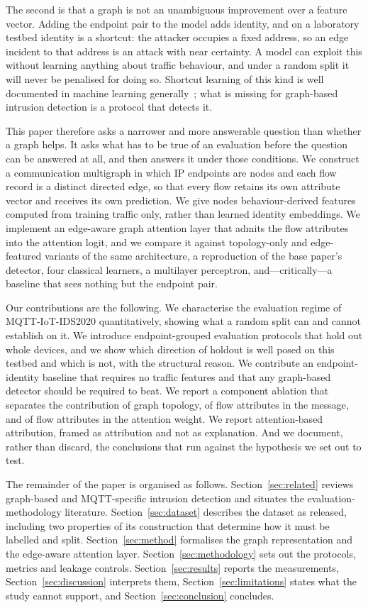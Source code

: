 The second is that a graph is not an unambiguous improvement over a feature
vector. Adding the endpoint pair to the model adds identity, and on a
laboratory testbed identity is a shortcut: the attacker occupies a fixed
address, so an edge incident to that address is an attack with near certainty.
A model can exploit this without learning anything about traffic behaviour, and
under a random split it will never be penalised for doing so. Shortcut learning
of this kind is well documented in machine learning
generally~\cite{geirhos2020shortcut}; what is missing for graph-based intrusion
detection is a protocol that detects it.

This paper therefore asks a narrower and more answerable question than whether
a graph helps. It asks what has to be true of an evaluation before the question
can be answered at all, and then answers it under those conditions. We
construct a communication multigraph in which IP endpoints are nodes and each
flow record is a distinct directed edge, so that every flow retains its own
attribute vector and receives its own prediction. We give nodes
behaviour-derived features computed from training traffic only, rather than
learned identity embeddings. We implement an edge-aware graph attention layer
that admits the flow attributes into the attention logit, and we compare it
against topology-only and edge-featured variants of the same architecture, a
reproduction of the base paper's detector, four classical learners, a
multilayer perceptron, and---critically---a baseline that sees nothing but the
endpoint pair.

Our contributions are the following. We characterise the evaluation
regime of MQTT-IoT-IDS2020 quantitatively, showing what a random split can and
cannot establish on it. We introduce endpoint-grouped evaluation protocols that
hold out whole devices, and we show which direction of holdout is well posed on
this testbed and which is not, with the structural reason. We contribute an
endpoint-identity baseline that requires no traffic features and that any
graph-based detector should be required to beat. We report a component
ablation that separates the contribution of graph topology, of flow attributes
in the message, and of flow attributes in the attention weight. We report
attention-based attribution, framed as attribution and not as explanation. And
we document, rather than discard, the conclusions that run against the
hypothesis we set out to test.

The remainder of the paper is organised as follows.
Section~\ref{sec:related} reviews graph-based and MQTT-specific intrusion
detection and situates the evaluation-methodology literature.
Section~\ref{sec:dataset} describes the dataset as released, including two
properties of its construction that determine how it must be labelled and
split. Section~\ref{sec:method} formalises the graph representation and the
edge-aware attention layer. Section~\ref{sec:methodology} sets out the
protocols, metrics and leakage controls. Section~\ref{sec:results} reports the
measurements, Section~\ref{sec:discussion} interprets them,
Section~\ref{sec:limitations} states what the study cannot support, and
Section~\ref{sec:conclusion} concludes.
